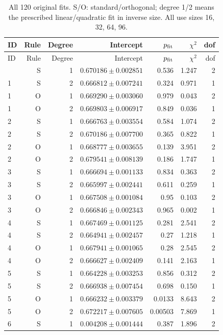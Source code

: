 {\small\setlength{\tabcolsep}{3.5pt}
\begin{longtable}{lrrrrrr}
\caption{All 120 original fits. S/O: standard/orthogonal; degree 1/2 means the prescribed linear/quadratic fit in inverse size. All use sizes 16, 32, 64, 96.}\\
\toprule
ID & Rule & Degree & Intercept & $p_{\rm fit}$ & $\chi^2$ & dof\\
\midrule
\endfirsthead
\toprule
ID & Rule & Degree & Intercept & $p_{\rm fit}$ & $\chi^2$ & dof\\
\midrule
\endhead
\bottomrule\endfoot
1 & S & 1 & $0.670186\pm0.002851$ & 0.536 & 1.247 & 2\\
1 & S & 2 & $0.666812\pm0.007241$ & 0.324 & 0.971 & 1\\
1 & O & 1 & $0.669290\pm0.003060$ & 0.979 & 0.043 & 2\\
1 & O & 2 & $0.669803\pm0.006917$ & 0.849 & 0.036 & 1\\
2 & S & 1 & $0.666763\pm0.003554$ & 0.584 & 1.074 & 2\\
2 & S & 2 & $0.670186\pm0.007700$ & 0.365 & 0.822 & 1\\
2 & O & 1 & $0.668777\pm0.003655$ & 0.139 & 3.951 & 2\\
2 & O & 2 & $0.679541\pm0.008139$ & 0.186 & 1.747 & 1\\
3 & S & 1 & $0.666694\pm0.001133$ & 0.834 & 0.363 & 2\\
3 & S & 2 & $0.665997\pm0.002441$ & 0.611 & 0.259 & 1\\
3 & O & 1 & $0.667508\pm0.001084$ & 0.95 & 0.103 & 2\\
3 & O & 2 & $0.666846\pm0.002343$ & 0.965 & 0.002 & 1\\
4 & S & 1 & $0.667469\pm0.001125$ & 0.281 & 2.541 & 2\\
4 & S & 2 & $0.664941\pm0.002457$ & 0.27 & 1.218 & 1\\
4 & O & 1 & $0.667941\pm0.001065$ & 0.28 & 2.545 & 2\\
4 & O & 2 & $0.666627\pm0.002409$ & 0.141 & 2.163 & 1\\
5 & S & 1 & $0.664228\pm0.003253$ & 0.856 & 0.312 & 2\\
5 & S & 2 & $0.666938\pm0.007454$ & 0.698 & 0.150 & 1\\
5 & O & 1 & $0.666232\pm0.003379$ & 0.0133 & 8.643 & 2\\
5 & O & 2 & $0.672217\pm0.007605$ & 0.00503 & 7.869 & 1\\
6 & S & 1 & $0.004208\pm0.001444$ & 0.387 & 1.896 & 2\\

\end{longtable}}
